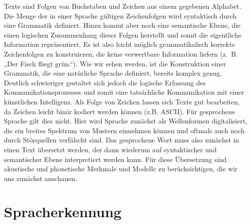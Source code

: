 Texte sind Folgen von Buchstaben und Zeichen aus einem gegebenen Alphabet.
Die Menge der in einer Sprache gültigen Zeichenfolgen wird syntaktisch durch eine Grammatik definiert.
Hinzu kommt aber noch eine semantische Ebene, die einen logischen Zusammenhang dieser Folgen herstellt und somit die eigentliche Information repräsentiert.
Es ist also leicht möglich grammatikalisch korrekte Zeichenfolgen zu konstruieren, die keine verwertbare Information liefern (z.~B.
„Der Fisch fliegt grün.“).
Wie wir sehen werden, ist die Konstruktion einer Grammatik, die eine natürliche Sprache definiert, bereits komplex genug.
Deutlich schwieriger gestaltet sich jedoch die logische Erfassung des Kommunikationsprozesses und somit eine tatsächliche Kommunikation mit einer künstlichen Intelligenz.
Als Folge von Zeichen lassen sich Texte gut bearbeiten, da Zeichen leicht binär kodiert werden können (z.B. ASCII).
Für gesprochene Sprache gilt dies nicht.
Hier wird Sprache zunächst als Wellenformen digitalisiert, die ein breites Spektrum von Mustern einnehmen können und oftmals auch noch durch Störquellen verfälscht sind.
Das gesprochene Wort muss also zunächst in einen Text übersetzt werden, der dann wiederum auf syntaktischer und semantischer Ebene interpretiert werden kann.
Für diese Übersetzung sind akustische und phonetische Merkmale und Modelle zu berücksichtigen, die wir uns zunächst anschauen.

\section{Spracherkennung}
